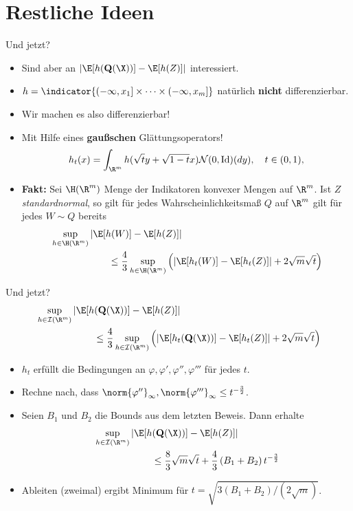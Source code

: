 \section{Restliche Ideen}
\begin{frame}{Und jetzt?}
    \begin{itemize}
        \item Sind aber an $\left|\E[h(\mathbf{Q}(\X))]-\E[h(Z)]\right|$ interessiert. 
        \item $h = \indicator{(-\infty, x_1] \times \cdots \times (-\infty, x_m]}$ natürlich \textbf{nicht} differenzierbar. 
        \pause
        \item Wir machen es also differenzierbar!
        \item Mit Hilfe eines \textbf{gaußschen} Glättungsoperators!
        \[
        h_t(x) = \int_{\R^m} h(\sqrt{t}y + \sqrt{1-t}x) \mathcal{N}(0, \operatorname{Id})(dy), \quad t \in (0,1), 
        \]
        \pause
        \item \textbf{Fakt:} Sei $\H(\R^m)$ Menge der Indikatoren konvexer Mengen auf $\R^m$. Ist $Z$ \textit{standardnormal}, so gilt für jedes Wahrscheinlichkeitsmaß $Q$ auf $\R^m$ gilt für jedes $W \sim Q$ bereits \begin{align*}
        &\sup_{h \in \H(\R^m)} \left|\E[h(W)] - \E[h(Z)]\right| \\ & \qquad \qquad \qquad \leq \frac{4}{3} \sup_{h \in \H(\R^m)} \left(\left|\E[h_t(W)] - \E[h_t(Z)]\right| + 2 \sqrt{m}\sqrt{t}\right)
        \end{align*}
    \end{itemize}
\end{frame}



\begin{frame}{Und jetzt?}
    \small 
\textcolor{orange}{
\begin{align*}
        &\sup_{h \in \mathcal{I}(\R^m)} \left|\E[h(\mathbf{Q}(\X))] - \E[h(Z)]\right| \\ & \qquad \qquad \qquad \leq \frac{4}{3} \sup_{h \in \mathcal{I}(\R^m)} \left(\left|\E[h_t(\mathbf{Q}(\X))] - \E[h_t(Z)]\right| + 2 \sqrt{m}\sqrt{t}\right)
        \end{align*}}
    \begin{itemize}
        \item $h_t$ erfüllt die Bedingungen an $\varphi, \varphi', \varphi'', \varphi'''$ für jedes $t$. 
        \item Rechne nach, dass $\norm{\varphi''}_\infty, \norm{\varphi'''}_\infty \leq t^{-\frac{3}{2}}$. 
        \item Seien $B_1$ und $B_2$ die Bounds aus dem letzten Beweis. Dann erhalte
        \begin{align*}
        &\sup_{h \in \mathcal{I}(\R^m)} \left|\E[h(\mathbf{Q}(\X))] - \E[h(Z)]\right| \\ & \qquad \qquad \qquad \leq \frac{8}{3}\sqrt{m}\sqrt{t} + \frac{4}{3}\left(B_1 + B_2\right)t^{-\frac{3}{2}}
        \end{align*}
        \item Ableiten (zweimal) ergibt Minimum für $t = \sqrt{3(B_1 + B_2)/(2\sqrt{m})}$. 
    \end{itemize}
\end{frame}

